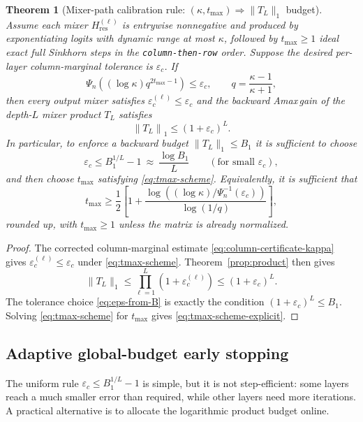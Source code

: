 \documentclass[11pt]{article}
\numberwithin{equation}{section}
\theoremstyle{plain}
\newtheorem{theorem}{Theorem}[section]
\theoremstyle{definition}
\theoremstyle{remark}
\newcommand{\norm}[1]{\left\lVert #1 \right\rVert}
\newcommand{\Hres}{H_{\mathrm{res}}}
\newcommand{\Amax}{\textsf{Amax}\,}
\begin{document}
\begin{theorem}[Mixer-path calibration rule: $(\kappa,t_{\max}) \Rightarrow \|T_L\|_1$ budget]\label{thm:calibration}
Assume each mixer $\Hres^{(\ell)}$ is entrywise nonnegative and produced by exponentiating logits with dynamic range at most $\kappa$, followed by $t_{\max}\ge1$ ideal exact full Sinkhorn steps in the \texttt{column-then-row} order. Suppose the desired per-layer column-marginal tolerance is $\varepsilon_c$. If
\begin{equation}\label{eq:tmax-scheme}
\Psi_n\!\left((\log\kappa)q^{2t_{\max}-1}\right)
\le
\varepsilon_c,
\qquad
q=\frac{\kappa-1}{\kappa+1},
\end{equation}
then every output mixer satisfies $\varepsilon_c^{(\ell)}\le\varepsilon_c$ and the backward \Amax gain of the depth-$L$ mixer product $T_L$ satisfies
\begin{equation}
\norm{T_L}_1 \le (1+\varepsilon_c)^L.
\end{equation}
In particular, to enforce a backward budget $\|T_L\|_1\le B_1$ it is sufficient to choose
\begin{equation}\label{eq:eps-from-B}
\varepsilon_c \le B_1^{1/L}-1 \ \approx\ \frac{\log B_1}{L}
\qquad (\text{for small }\varepsilon_c),
\end{equation}
and then choose $t_{\max}$ satisfying \eqref{eq:tmax-scheme}. Equivalently, it is sufficient that
\begin{equation}\label{eq:tmax-scheme-explicit}
t_{\max}
\ge
\frac12
\left[
1+
\frac{\log\!\left((\log\kappa)/\Psi_n^{-1}(\varepsilon_c)\right)}
{\log(1/q)}
\right],
\end{equation}
rounded up, with $t_{\max}\ge1$ unless the matrix is already normalized.
\end{theorem}

\begin{proof}
The corrected column-marginal estimate \eqref{eq:column-certificate-kappa} gives $\varepsilon_c^{(\ell)}\le\varepsilon_c$ under \eqref{eq:tmax-scheme}. Theorem~\ref{prop:product} then gives
\[
\|T_L\|_1
\le
\prod_{\ell=1}^L(1+\varepsilon_c^{(\ell)})
\le
(1+\varepsilon_c)^L.
\]
The tolerance choice \eqref{eq:eps-from-B} is exactly the condition $(1+\varepsilon_c)^L\le B_1$. Solving \eqref{eq:tmax-scheme} for $t_{\max}$ gives \eqref{eq:tmax-scheme-explicit}.
\end{proof}

\subsection{Adaptive global-budget early stopping}\label{subsec:adaptive_global_budget}
The uniform rule $\varepsilon_c\le B_1^{1/L}-1$ is simple, but it is not step-efficient: some layers reach a much smaller error than required, while other layers need more iterations. A practical alternative is to allocate the logarithmic product budget online.
\end{document}
